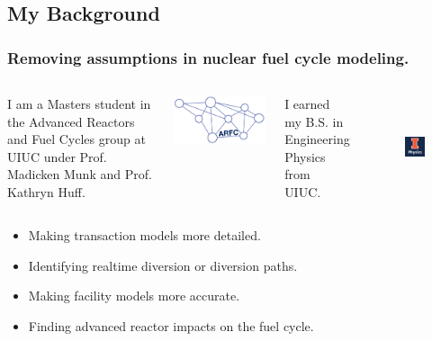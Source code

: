 \documentclass[9pt]{beamer}
\begin{document}
\subsection{My Background}
  \begin{frame}
    \frametitle{Removing assumptions in nuclear fuel cycle modeling.}
    \begin{columns}
      \column[t]{5cm}
      I am a Masters student in the Advanced Reactors and Fuel Cycles group at
      UIUC under Prof. Madicken Munk and Prof. Kathryn Huff.
      \begin{center}
              \includegraphics[height=0.2\textheight]{./images/arfc-logo}
      \end{center}

      \column[t]{5cm}
      I earned my B.S. in Engineering Physics from UIUC.
      \begin{figure}[htbp!]
        \begin{center}
          \includegraphics[height=3cm]{./images/ill_phys.png}
        \end{center}
        \label{fig:uiuc_phys}
      \end{figure}
    \end{columns}
    \begin{itemize}
      \item Making transaction models more detailed.
      \item Identifying realtime diversion or diversion paths.
      \item Making facility models more accurate.
      \item Finding advanced reactor impacts on the fuel cycle.
    \end{itemize}
  \end{frame}
\end{document}
